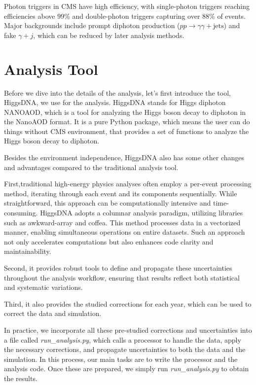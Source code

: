 Photon triggers in CMS have high efficiency, with single-photon triggers reaching efficiencies above $99\%$ and double-photon triggers capturing over $88\%$ of events. Major backgrounds include prompt diphoton production ($pp \to \gamma\gamma + \text{jets}$) and fake $\gamma + j $, which can be reduced by later analysis methods.

\section{Analysis Tool}

Before we dive into the details of the analysis, let's first introduce the tool, HiggsDNA, we use for the analysis. HiggsDNA stands for Higgs diphoton NANOAOD, which is a tool for analyzing the Higgs boson decay to diphoton in the NanoAOD format. It is a pure Python package, which means the user can do things without CMS environment, that provides a set of functions to analyze the Higgs boson decay to diphoton. 

Besides the environment independence, HiggsDNA also has some other changes and advantages compared to the traditional analysis tool.

First,traditional high-energy physics analyses often employ a per-event processing method, iterating through each event and its components sequentially. While straightforward, this approach can be computationally intensive and time-consuming. HiggsDNA adopts a columnar analysis paradigm, utilizing libraries such as awkward-array and coffea. This method processes data in a vectorized manner, enabling simultaneous operations on entire datasets. Such an approach not only accelerates computations but also enhances code clarity and maintainability.

Second, it provides robust tools to define and propagate these uncertainties throughout the analysis workflow, ensuring that results reflect both statistical and systematic variations.

Third, it also provides the studied corrections for each year, which can be used to correct the data and simulation.

In practice, we incorporate all these pre-studied corrections and uncertainties into a file called \textit{run\_analysis.py}, which calls a processor to handle the data, apply the necessary corrections, and propagate uncertainties to both the data and the simulation. In this process, our main tasks are to write the processor and the analysis code. Once these are prepared, we simply run \textit{run\_analysis.py} to obtain the results.

